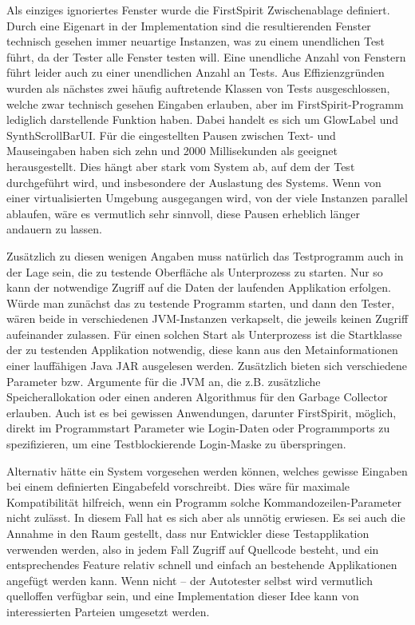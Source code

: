 Als einziges ignoriertes Fenster wurde die \glqq{}FirstSpirit Zwischenablage\grqq{} definiert. Durch eine
Eigenart in der Implementation sind die resultierenden Fenster technisch gesehen immer neuartige
Instanzen, was zu einem unendlichen Test führt, da der Tester alle Fenster testen will.
Eine unendliche Anzahl von Fenstern führt leider auch zu einer unendlichen Anzahl an Tests.
Aus Effizienzgründen wurden als nächstes zwei häufig auftretende Klassen von Tests ausgeschlossen,
welche zwar technisch gesehen Eingaben erlauben, aber im FirstSpirit-Programm lediglich
darstellende Funktion haben. Dabei handelt es sich um \glqq{}GlowLabel\grqq{} und \glqq{}SynthScrollBarUI\grqq{}.
Für die eingestellten Pausen zwischen Text- und Mauseingaben haben sich zehn und 2000 Millisekunden
als geeignet herausgestellt. Dies hängt aber stark vom System ab, auf dem der Test durchgeführt wird,
und insbesondere der Auslastung des Systems. Wenn von einer virtualisierten Umgebung ausgegangen
wird, von der viele Instanzen parallel ablaufen, wäre es vermutlich sehr sinnvoll, diese
Pausen erheblich länger andauern zu lassen.

Zusätzlich zu diesen wenigen Angaben muss natürlich das Testprogramm auch in der Lage sein,
die zu testende Oberfläche als Unterprozess zu starten. Nur so kann der notwendige Zugriff
auf die Daten der laufenden Applikation erfolgen. Würde man zunächst das zu testende
Programm starten, und dann den Tester, wären beide in verschiedenen JVM-Instanzen
verkapselt, die jeweils keinen Zugriff aufeinander zulassen. Für einen solchen
Start als Unterprozess ist die Startklasse der zu testenden Applikation notwendig,
diese kann aus den Metainformationen einer lauffähigen Java \glqq{}JAR\grqq{}
ausgelesen werden. Zusätzlich bieten sich verschiedene Parameter bzw. Argumente
für die JVM an, die z.B. zusätzliche Speicherallokation oder einen anderen
Algorithmus für den Garbage Collector erlauben. Auch ist es bei gewissen Anwendungen,
darunter FirstSpirit, möglich, direkt im Programmstart Parameter wie Login-Daten
oder Programmports zu spezifizieren, um eine Testblockierende Login-Maske
zu überspringen.

Alternativ hätte ein System vorgesehen werden können, welches gewisse Eingaben
bei einem definierten Eingabefeld vorschreibt. Dies wäre für maximale Kompatibilität
hilfreich, wenn ein Programm solche Kommandozeilen-Parameter nicht zulässt.
In diesem Fall hat es sich aber als unnötig erwiesen. Es sei auch die
Annahme in den Raum gestellt, dass nur Entwickler diese Testapplikation
verwenden werden, also in jedem Fall Zugriff auf Quellcode besteht,
und ein entsprechendes Feature relativ schnell und einfach an bestehende
Applikationen angefügt werden kann. Wenn nicht -- der Autotester selbst
wird vermutlich quelloffen verfügbar sein, und eine Implementation
dieser Idee kann von interessierten Parteien umgesetzt werden.


